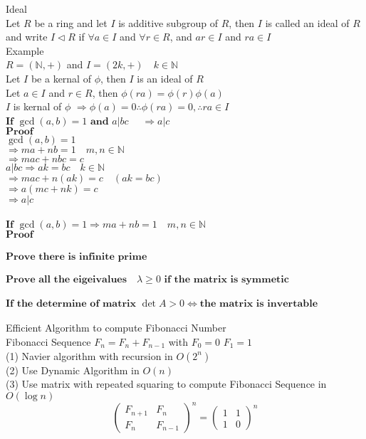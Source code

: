 \documentclass[10pt]{article}
\begin{document}
Ideal\\
Let $R$ be a ring and let $I$ is additive subgroup of $R$, then $I$ is called an ideal of $R$ and write $I \triangleleft R$ 
\quad if $\forall a \in I$ and $\forall r \in R $, and $ ar \in I$ and $ra \in I$\\

Example\\
$R = (\mathbb{N}, +)$ and $I = (2k, +) \quad k \in \mathbb{N}$\\

Let $I$ be a kernal of $\phi$, then $I$ is an ideal of $R$\\
Let $a \in I$ and $r \in R$, then $\phi(ra) = \phi(r)\phi(a)$\\
$I$ is kernal of $\phi$ $\Rightarrow \phi(a) = 0 \therefore \phi(ra) = 0, \therefore ra \in I$\\

$\textbf{If }  \gcd(a, b) = 1 \textbf{ and }  a \vert bc \quad$  $\Rightarrow a \vert c$ \\
$\textbf{Proof}$ \\
$\gcd(a, b) = 1  $\\
$\Rightarrow ma+nb = 1\quad m, n \in \mathbb{N} $ \\
$\Rightarrow mac + nbc = c$ \\
$a \vert bc \Rightarrow ak = bc \quad k \in \mathbb{N} $ \\
$\Rightarrow mac + n(ak)=c \quad    (ak=bc) $ \\
$\Rightarrow a(mc + nk) = c$  \\
$\Rightarrow a \vert c $ \\
\\
$\textbf{If } \gcd(a, b) = 1 \Rightarrow ma + nb = 1 \quad m, n \in \mathbb{N}$\\
$\textbf{Proof}$\\
\\
$\textbf{Prove there is infinite prime}$\\
\\
$\textbf{Prove all the eigeivalues}\quad  \lambda \geq  0  \textbf{ if the matrix is symmetic}$\\
\\
$\textbf{If the determine of matrix } \det{A} > 0 \iff \textbf{the matrix is invertable}$\\
\\
Efficient Algorithm to compute Fibonacci Number \\
Fibonacci Sequence   
$F_{n} = F_{n} + F_{n-1}$ with $F_{0} = 0$
$F_{1} = 1$ \\
(1) Navier algorithm with recursion in $O(2^n)$ \\
(2) Use Dynamic Algorithm in $O(n)$\\
(3) Use matrix with repeated squaring to compute Fibonacci Sequence in $O(\log{n})$
\[\left(\begin{array}{cc} F_{n+1} & F_{n} \\ F_{n} & F_{n-1} \end{array} \right)^n =  \left(\begin{array}{cc}1 & 1 \\ 1 & 0 \end{array} \right)^n \]
\\
\newpage
\end{document}
